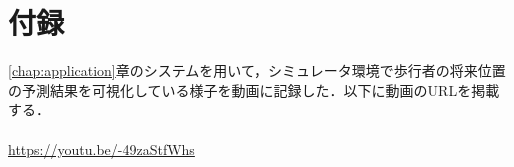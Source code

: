 \chapter*{付録}

\ref{chap:application}章のシステムを用いて，シミュレータ環境で歩行者の将来位置の予測結果を可視化している様子を動画に記録した．以下に動画のURLを掲載する．
\\
\\
\url{https://youtu.be/-49zaStfWhs}